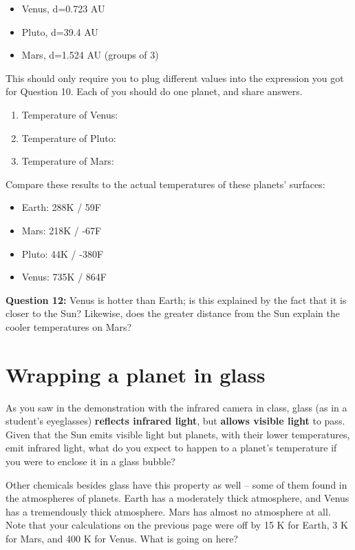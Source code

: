 \documentclass[11pt]{article}
\def\BI{\begin{itemize}}
\def\EI{\end{itemize}}
\begin{document}
\BI
\item Venus, d=0.723 AU
\item Pluto, d=39.4 AU 
\item Mars, d=1.524 AU (groups of 3)
\EI

This should only require you to plug different values into the expression you got for Question 10. Each of you should do one planet, and share answers. 

\begin{enumerate}

\item Temperature of Venus:
\bigskip
\item Temperature of Pluto:
\bigskip
\item Temperature of Mars:
\bigskip

\end{enumerate}

Compare these results to the actual
temperatures of these planets' surfaces:

\BI
\item Earth: 288K / 59F
\item Mars: 218K / -67F 
\item Pluto: 44K / -380F
\item Venus: 735K / 864F
\EI

{\bf Question 12:} 
Venus is hotter than Earth; is this explained by the fact that it is closer to the Sun? Likewise, does the greater distance from the Sun explain the cooler temperatures on Mars?


\newpage

\section*{Wrapping a planet in glass}

As you saw in the demonstration with the infrared camera in class, glass (as in a student's eyeglasses) {\bf reflects infrared light}, but {\bf allows visible light} to pass.
Given that the Sun emits visible light but planets, with their lower temperatures, emit infrared light, what do you expect to happen to a planet's temperature if you were to
enclose it in a glass bubble? 

\bigskip
\bigskip
\bigskip
\bigskip
\bigskip

Other chemicals besides glass have this property as well -- some of them found in the atmospheres of planets. Earth has a moderately thick atmosphere, and Venus has a tremendously thick
atmosphere. Mars has almost no atmosphere at all. Note that your calculations on the previous page were off by 15 K for Earth, 3 K for Mars, and 400 K for Venus. 
What is going on here? 
\end{document}
